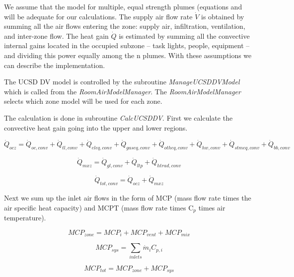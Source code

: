 {We assume that the model for multiple, equal strength plumes (equations and will be adequate for our calculations. The supply air flow rate \(\dot V\) is obtained by summing all the air flows entering the zone: supply air, infiltration, ventilation, and inter-zone flow. The heat gain \(\dot Q\) is estimated by summing all the convective internal gains located in the occupied subzone -- task lights, people, equipment -- and dividing this power equally among the n plumes. With these assumptions we can describe the implementation.

The UCSD DV model is controlled by the subroutine \emph{ManageUCSDDVModel} which is called from the \emph{RoomAirModelManager}. The \emph{RoomAirModelManager} selects which zone model will be used for each zone.

The calculation is done in subroutine \emph{CalcUCSDDV}. First we calculate the convective heat gain going into the upper and lower regions.

\begin{equation}
\dot Q_{ocz} = \dot Q_{oc,conv} + \dot Q_{tl,conv} + \dot Q_{eleq,conv} + \dot Q_{gaseq,conv} + \dot Q_{otheq,conv} + \dot Q_{hw,conv} + \dot Q_{stmeq,conv} + \dot Q_{bb,conv}
\end{equation}

\begin{equation}
{\dot Q_{mxz}} = {\dot Q_{gl,conv}} + {\dot Q_{ltp}} + {\dot Q_{htrad,conv}}
\end{equation}

\begin{equation}
{\dot Q_{tot,conv}} = {\dot Q_{ocz}} + {\dot Q_{mxz}}
\end{equation}

Next we sum up the inlet air flows in the form of MCP (mass flow rate times the air specific heat capacity) and MCPT (mass flow rate times C\(_{p}\) times air temperature).

\begin{equation}
MC{P_{zone}} = MC{P_i} + MC{P_{vent}} + MC{P_{mix}}
\end{equation}

\begin{equation}
MC{P_{sys}} = \sum\limits_{inlets} {{{\dot m}_i}} {C_{p,i}}
\end{equation}

\begin{equation}
MC{P_{tot}} = MC{P_{zone}} + MC{P_{sys}}
\end{equation}

}
